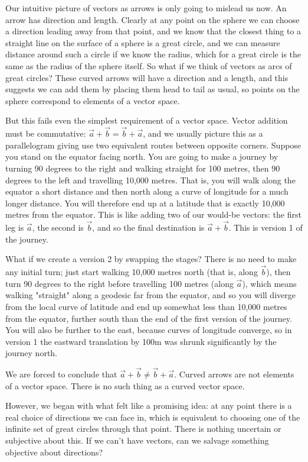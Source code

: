 Our intuitive picture of vectors as arrows is only going to mislead us now. An arrow has direction and length. Clearly at any point on the sphere we can choose a direction leading away from that point, and we know that the closest thing to a straight line on the surface of a sphere is a great circle, and we can measure distance around such a circle if we know the radius, which for a great circle is the same as the radius of the sphere itself. So what if we think of vectors as arcs of great circles? These curved arrows will have a direction and a length, and this suggests we can add them by placing them head to tail as usual, so points on the sphere correspond to elements of a vector space.

But this fails even the simplest requirement of a vector space. Vector addition must be commutative: $\vec{a} + \vec{b} = \vec{b} + \vec{a}$, and we usually picture this as a parallelogram giving use two equivalent routes between opposite corners. Suppose you stand on the equator facing north. You are going to make a journey by turning 90 degrees to the right and walking straight for 100 metres, then 90 degrees to the left and travelling 10,000 metres. That is, you will walk along the equator a short distance and then north along a curve of longitude for a much longer distance. You will therefore end up at a latitude that is exactly 10,000 metres from the equator. This is like adding two of our would-be vectors: the first leg is $\vec{a}$, the second is $\vec{b}$, and so the final destination is $\vec{a} + \vec{b}$. This is version 1 of the journey. 

What if we create a version 2 by swapping the stages? There is no need to make any initial turn; just start walking 10,000 metres north (that is, along $\vec{b}$), then turn 90 degrees to the right before travelling 100 metres (along $\vec{a}$), which means walking "straight" along a geodesic far from the equator, and so you will diverge from the local curve of latitude and end up somewhat less than 10,000 metres from the equator, further south than the end of the first version of the journey. You will also be further to the east, because curves of longitude converge, so in version 1 the eastward translation by 100m was shrunk significantly by the journey north.

We are forced to conclude that $\vec{a} + \vec{b} \ne \vec{b} + \vec{a}$. Curved arrows are not elements of a vector space. There is no such thing as a curved vector space.

However, we began with what felt like a promising idea: at any point there is a real choice of directions we can face in, which is equivalent to choosing one of the infinite set of great circles through that point. There is nothing uncertain or subjective about this. If we can't have vectors, can we salvage something objective about directions?

